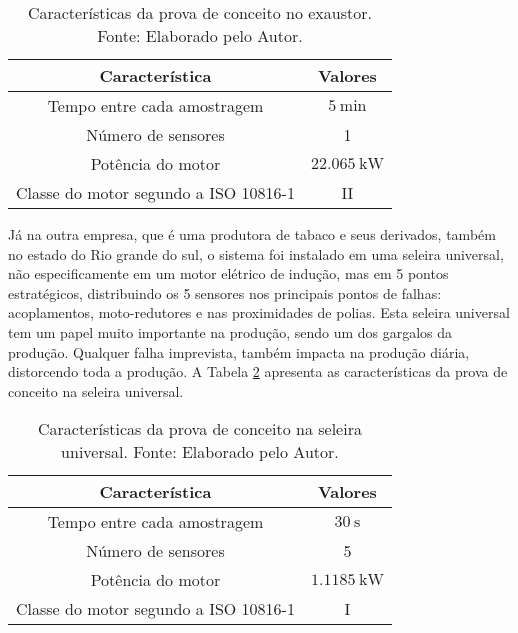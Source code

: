 \documentclass[a4paper]{ifacconf}
\begin{document}
\begin{table}[H]
    \caption{Características da prova de conceito no exaustor. Fonte: Elaborado pelo Autor.}
    \label{tab:exautor}
    \centering%
    \begin{minipage}{.4\textwidth}
      \begin{tabular*}{\textwidth}{c|c}
        \hline
        Característica                          & Valores                                    \\ \hline
        \hline
        Tempo entre cada amostragem             &  $\SI{5}{\minute}$                         \\
        Número de sensores                      &  1                                         \\ 
        Potência do motor                       &  $\SI{22.065}{\kilo\watt}$                      \\
        Classe do motor segundo a  ISO 10816-1  &  II                                         \\
      \end{tabular*} 
    \end{minipage}
  \end{table}


Já na outra empresa, que é uma produtora de tabaco e seus derivados, também no estado do Rio grande do sul, o sistema foi instalado em uma 
seleira universal, não especificamente em um motor elétrico de indução, mas em 5 pontos estratégicos, distribuindo os 5 sensores nos principais pontos 
de falhas: acoplamentos, moto-redutores e nas proximidades de polias. Esta seleira universal tem um papel muito importante na produção, sendo um dos gargalos
da produção. Qualquer falha imprevista, também impacta na produção diária, distorcendo toda a produção. A Tabela \ref{tab:seleira_universal} apresenta 
as características da prova de conceito na seleira universal.

\begin{table}[H]
    \caption{Características da prova de conceito na seleira universal. Fonte: Elaborado pelo Autor.}
    \label{tab:seleira_universal}
    \centering%
    \begin{minipage}{.4\textwidth}
      \begin{tabular*}{\textwidth}{c|c}
        \hline
        Característica                          & Valores                                    \\ \hline
        \hline
        Tempo entre cada amostragem             &  $\SI{30}{\second}$                        \\
        Número de sensores                      &  5                                         \\ 
        Potência do motor                       &  $\SI{1.1185}{\kilo\watt}$                 \\
        Classe do motor segundo a  ISO 10816-1  &  I                                         \\
      \end{tabular*}
    \end{minipage}
  \end{table}
\end{document}
